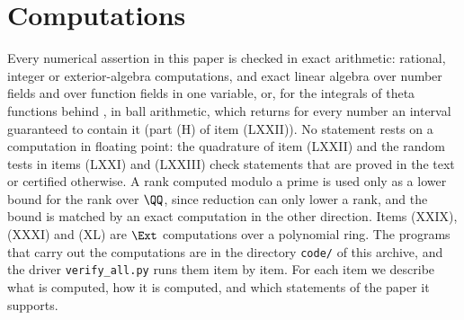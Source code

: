 \section{Computations}\label{sec:verification}

Every numerical assertion in this paper is checked in exact arithmetic:
rational, integer or exterior-algebra computations, and exact linear algebra
over number fields and over function fields in one variable, or, for the
integrals of theta functions behind , in ball
arithmetic, which returns for every number an interval guaranteed to
contain it (part (H) of item (LXXII)). No statement rests on a computation
in floating point: the quadrature of item (LXXII) and the random tests in
items (LXXI) and (LXXIII) check statements that are proved in the text or
certified otherwise. A rank computed modulo a prime is used only
as a lower bound for the rank over $\QQ$, since reduction can only lower a
rank, and the bound is matched by an exact computation in the other
direction. Items (XXIX), (XXXI) and (XL) are $\Ext$
computations over a polynomial ring. The programs that carry out the
computations are in the directory \texttt{code/} of this archive, and the driver
\texttt{verify\_all.py} runs them item by item. For each item we describe what is
computed, how it is computed, and which statements of the paper it supports.

